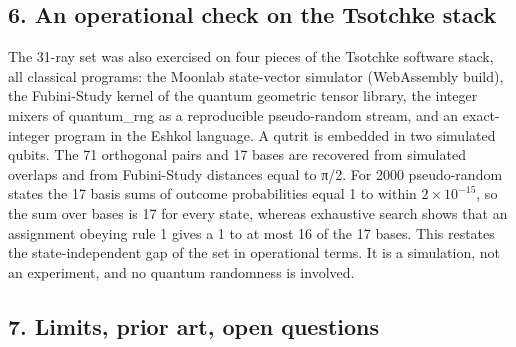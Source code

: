 \documentclass[11pt,a4paper]{article}
\begin{document}
\subsection{6. An operational check on the Tsotchke stack}\label{6-an-operational-check-on-the-tsotchke-stack}

The 31-ray set was also exercised on four pieces of the Tsotchke software stack, all classical
programs: the Moonlab state-vector simulator (WebAssembly build), the Fubini-Study kernel of the
quantum geometric tensor library, the integer mixers of quantum\_rng as a reproducible pseudo-random
stream, and an exact-integer program in the Eshkol language. A qutrit is embedded in two simulated
qubits. The 71 orthogonal pairs and 17 bases are recovered from simulated overlaps and from
Fubini-Study distances equal to π/2. For 2000 pseudo-random states the 17 basis sums of outcome
probabilities equal 1 to within \(2 \times 10^{-15}\), so the sum over bases is 17 for every state, whereas
exhaustive search shows that an assignment obeying rule 1 gives a 1 to at most 16 of the 17 bases.
This restates the state-independent gap of the set in operational terms. It is a simulation, not an
experiment, and no quantum randomness is involved.

\subsection{7. Limits, prior art, open questions}\label{7-limits-prior-art-open-questions}
\end{document}
